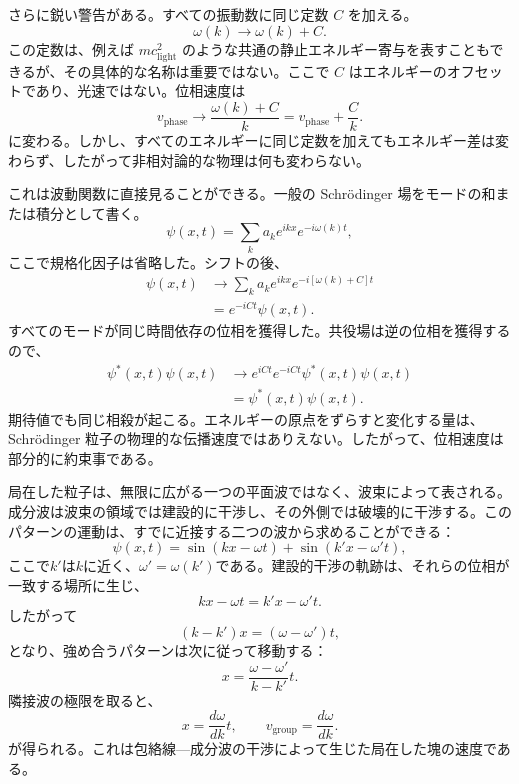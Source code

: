 さらに鋭い警告がある。すべての振動数に同じ定数 \(C\) を加える。
\begin{equation}
\omega(k)\longrightarrow \omega(k)+C.
\end{equation}
この定数は、例えば \(mc_{\mathrm{light}}^2\) のような共通の静止エネルギー寄与を表すこともできるが、その具体的な名称は重要ではない。ここで \(C\) はエネルギーのオフセットであり、光速ではない。位相速度は
\begin{equation}
v_{\mathrm{phase}}\longrightarrow
\frac{\omega(k)+C}{k}
=v_{\mathrm{phase}}+\frac{C}{k}.
\end{equation}
に変わる。しかし、すべてのエネルギーに同じ定数を加えてもエネルギー差は変わらず、したがって非相対論的な物理は何も変わらない。

これは波動関数に直接見ることができる。一般の Schr\"odinger 場をモードの和または積分として書く。
\begin{equation}
\psi(x,t)=\sum_k a_k e^{ikx}e^{-i\omega(k)t},
\end{equation}
ここで規格化因子は省略した。シフトの後、
\begin{align}
\psi(x,t)
&\longrightarrow
\sum_k a_k e^{ikx}e^{-i[\omega(k)+C]t}
\\
&=e^{-iCt}\psi(x,t).
\end{align}
すべてのモードが同じ時間依存の位相を獲得した。共役場は逆の位相を獲得するので、
\begin{equation}
\begin{aligned}
\psi^*(x,t)\psi(x,t)
&\longrightarrow
e^{iCt}e^{-iCt}\psi^*(x,t)\psi(x,t)
\\
&=\psi^*(x,t)\psi(x,t).
\end{aligned}
\end{equation}
期待値でも同じ相殺が起こる。エネルギーの原点をずらすと変化する量は、Schr\"odinger 粒子の物理的な伝播速度ではありえない。したがって、位相速度は部分的に約束事である。

局在した粒子は、無限に広がる一つの平面波ではなく、波束によって表される。成分波は波束の領域では建設的に干渉し、その外側では破壊的に干渉する。このパターンの運動は、すでに近接する二つの波から求めることができる：
\begin{equation}
\psi(x,t)=
\sin(kx-\omega t)+
\sin(k'x-\omega't),
\end{equation}
ここで\(k'\)は\(k\)に近く、\(\omega'=\omega(k')\)である。建設的干渉の軌跡は、それらの位相が一致する場所に生じ、
\begin{equation}
kx-\omega t=k'x-\omega't.
\end{equation}
したがって
\begin{equation}
(k-k')x=(\omega-\omega')t,
\end{equation}
となり、強め合うパターンは次に従って移動する：
\begin{equation}
x=\frac{\omega-\omega'}{k-k'}t.
\end{equation}
隣接波の極限を取ると、
\begin{equation}
x=\frac{d\omega}{dk}t,
\qquad
v_{\mathrm{group}}=\frac{d\omega}{dk}.
\end{equation}
が得られる。これは包絡線---成分波の干渉によって生じた局在した塊の速度である。

